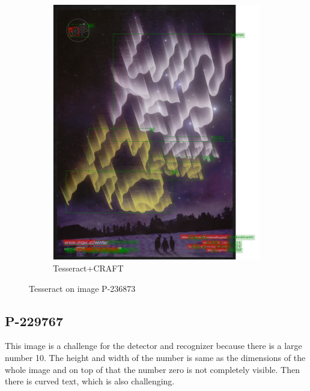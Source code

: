 \begin{figure}[hbtp!]
\begin{subfigure}{0.45\textwidth}
        \includegraphics[scale=0.3]{obrazky/plakaty/result_carfttesseract_vienna1_split_special_snesitive-73.png}
        \caption{Tesseract+CRAFT}
        \label{Im4:ex:craft}
    \end{subfigure}

    \caption{Tesseract on image P-236873}
    \label{Im4:ex:compl}
\end{figure}

\newpage
\subsection*{P-229767}
This image is a challenge for the detector and recognizer because there is a large number 10. The height and width of the number is same as the dimensions of the whole image and on top of that the number zero is not completely visible. Then there is curved text, which is also challenging. 

